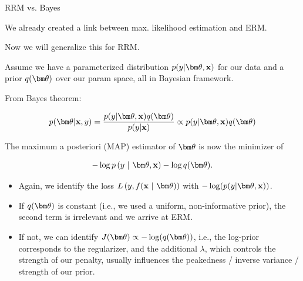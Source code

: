 \documentclass[11pt,compress,t,notes=noshow, xcolor=table]{beamer}
\begin{document}




\begin{vbframe} {RRM vs. Bayes}

We already created a link between max. likelihood estimation and ERM.

\lz 

Now we will generalize this for RRM.

\lz

Assume we have a parameterized distribution $p(y | \thetav, \xv)$ for our data and 
a prior $q(\thetav)$ over our param space, all in Bayesian framework.

\lz \lz

From Bayes theorem:

$$
p(\thetav | \xv, y) = \frac{p(y | \thetav, \xv) q(\thetav) }{p(y | \xv)} \propto 
p(y | \thetav, \xv) q(\thetav)
$$

\framebreak

The maximum a posteriori (MAP) estimator of $\thetav$ is now the minimizer of

$$
- \log p\left(y ~|~ \thetav, \xv\right) - \log q(\thetav).
$$

\begin{itemize}
  \item Again, we identify the loss $\Lxyt$ with $-\log(p(y | \thetav, \xv))$.
  \item If $q(\thetav)$ is constant (i.e., we used a uniform, non-informative 
  prior), the second term is irrelevant and we arrive at ERM.
  \item If not, we can identify $J(\thetav) \propto -\log(q(\thetav))$, i.e., 
  the log-prior corresponds to the regularizer, and the additional $\lambda$, which controls the strength of our
  penalty, usually influences the peakedness / inverse variance / strength of our prior.
\end{itemize}


\end{vbframe}
\end{document}
